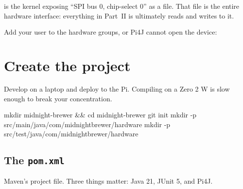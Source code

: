  is the kernel exposing ``SPI bus 0, chip-select 0'' as a
file. That file is the entire hardware interface: everything in Part~II is
ultimately reads and writes to it.

Add your user to the hardware groups, or Pi4J cannot open the device:


\section{Create the project}

Develop on a laptop and deploy to the Pi. Compiling on a Zero 2 W is slow
enough to break your concentration.

\begin{shell}
mkdir midnight-brewer && cd midnight-brewer
git init
mkdir -p src/main/java/com/midnightbrewer/hardware
mkdir -p src/test/java/com/midnightbrewer/hardware
\end{shell}

\subsection{The \texttt{pom.xml}}

Maven's project file. Three things matter: Java 21, JUnit 5, and Pi4J.

